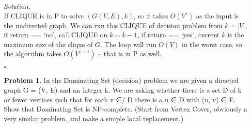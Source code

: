 \documentclass[11pt]{article}
\theoremstyle{definition}
\newtheorem{problem}{Problem}
\newenvironment{solution}{\noindent\emph{Solution.}}{\hfill$\square$}
\newcommand\tab[1][1cm]{\hspace*{#1}}
\begin{document}
\begin{solution}
\\
\tab If CLIQUE is in P to solve $(G(V,E), k)$, so it takes $O(V^\varepsilon)$ as the input is the undirected graph. We can run this CLIQUE of decision problem from $k=\vert V \vert$, if return == `no', call CLIQUE on $k = k-1$, if return == `yes', current $k$ is the maximum size of the clique of $G$. The loop will run $O(V)$ in the worst case, so the algorithm takes $O(V^{\varepsilon+1})$ -- that is in P as well.






\end{solution}









\newpage



\begin{problem}
In the Dominating Set (decision) problem we are given a directed graph G = (V, E) and an integer k. We are asking whether there is a set D of k or fewer vertices such that for each v ∈/ D there is a u ∈ D with (u, v) ∈ E. Show that Dominating Set is NP-complete. (Start from Vertex Cover, obviously a very similar problem, and make a simple local replacement.)
\end{problem}
\end{document}
